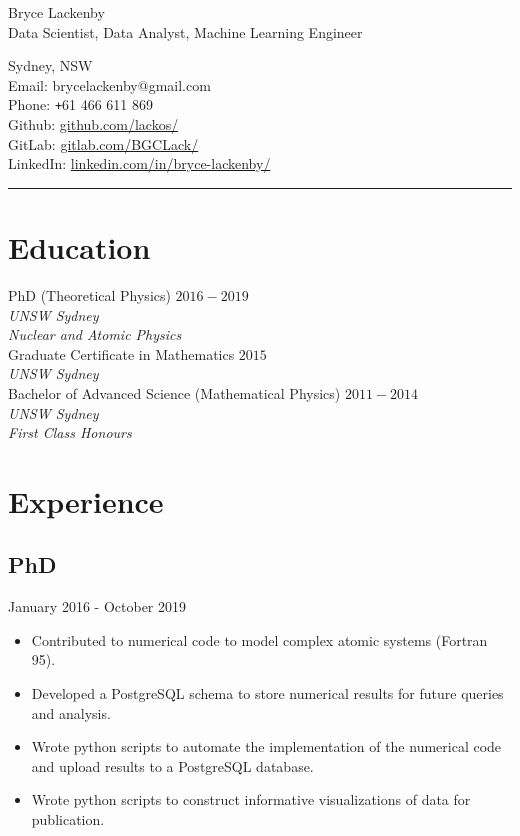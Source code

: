 \documentclass{article}
\def\Plus{\texttt{+}}
\begin{document}
\begin{minipage}{0.6\textwidth}
	\Huge
	Bryce Lackenby
	\vspace{0.5cm}
	\normalsize
	\\
	Data Scientist, Data Analyst, Machine Learning Engineer
\end{minipage}
\vspace{0.5cm}
\noindent
\begin{minipage}{0.6\textwidth}
  \small
	Sydney, NSW \\
	Email: brycelackenby@gmail.com \\
	Phone: \Plus61 466 611 869 \\
	Github: \href{https://github.com/lackos/}{github.com/lackos/} \\
	GitLab: \href{https://gitlab.com/BGCLack/}{gitlab.com/BGCLack/} \\
	LinkedIn: \href{https://www.linkedin.com/in/bryce-lackenby/}{linkedin.com/in/bryce-lackenby/}
\end{minipage}
\rule{16.6cm}{0.1cm}
\section*{Education}
PhD (Theoretical Physics) \hfill $2016-2019$ \\
\textit{UNSW Sydney} \\
\textit{Nuclear and Atomic Physics} \\
\linebreak
Graduate Certificate in Mathematics \hfill $2015$ \\
\textit{UNSW Sydney} \\
\linebreak
Bachelor of Advanced Science (Mathematical Physics) \hfill $2011-2014$ \\
\textit{UNSW Sydney} \\
\textit{First Class Honours}

\section*{Experience}
\subsection*{PhD}
\textcolor{light-gray}{January 2016 - October 2019}
\begin{itemize}
	\item Contributed to numerical code to model complex atomic systems (Fortran 95).
	\item Developed a PostgreSQL schema to store numerical results for future queries and analysis.
	\item Wrote python scripts to automate the implementation of the numerical code and upload results to a PostgreSQL database.
  \item Wrote python scripts to construct informative visualizations of data for publication.
\end{itemize}
\end{document}
